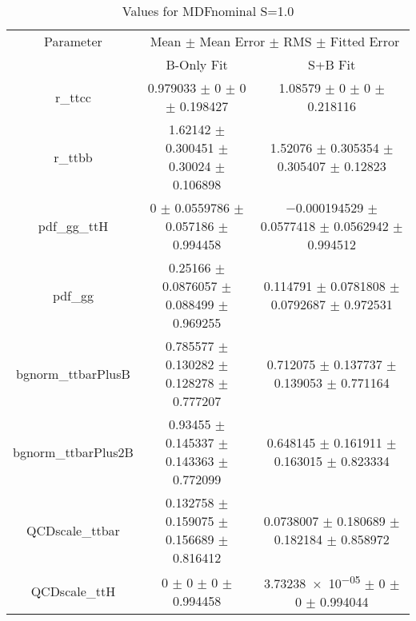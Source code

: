 \begin{table}
\centering
\caption{Values for MDFnominal S=1.0}
\begin{tabular}{ccc}
\toprule
Parameter & \multicolumn{2}{c}{Mean $\pm$ Mean Error $\pm$ RMS $\pm$ Fitted Error}\\
 & B-Only Fit & S+B Fit\\
\midrule
r\_ttcc & \num{0.979033} $\pm$ \num{0} $\pm$ \num{0} $\pm$ \num{0.198427} & \num{1.08579} $\pm$ \num{0} $\pm$ \num{0} $\pm$ \num{0.218116}\\
r\_ttbb & \num{1.62142} $\pm$ \num{0.300451} $\pm$ \num{0.30024} $\pm$ \num{0.106898} & \num{1.52076} $\pm$ \num{0.305354} $\pm$ \num{0.305407} $\pm$ \num{0.12823}\\
pdf\_gg\_ttH & \num{0} $\pm$ \num{0.0559786} $\pm$ \num{0.057186} $\pm$ \num{0.994458} & \num{-0.000194529} $\pm$ \num{0.0577418} $\pm$ \num{0.0562942} $\pm$ \num{0.994512}\\
pdf\_gg & \num{0.25166} $\pm$ \num{0.0876057} $\pm$ \num{0.088499} $\pm$ \num{0.969255} & \num{0.114791} $\pm$ \num{0.0781808} $\pm$ \num{0.0792687} $\pm$ \num{0.972531}\\
bgnorm\_ttbarPlusB & \num{0.785577} $\pm$ \num{0.130282} $\pm$ \num{0.128278} $\pm$ \num{0.777207} & \num{0.712075} $\pm$ \num{0.137737} $\pm$ \num{0.139053} $\pm$ \num{0.771164}\\
bgnorm\_ttbarPlus2B & \num{0.93455} $\pm$ \num{0.145337} $\pm$ \num{0.143363} $\pm$ \num{0.772099} & \num{0.648145} $\pm$ \num{0.161911} $\pm$ \num{0.163015} $\pm$ \num{0.823334}\\
QCDscale\_ttbar & \num{0.132758} $\pm$ \num{0.159075} $\pm$ \num{0.156689} $\pm$ \num{0.816412} & \num{0.0738007} $\pm$ \num{0.180689} $\pm$ \num{0.182184} $\pm$ \num{0.858972}\\
QCDscale\_ttH & \num{0} $\pm$ \num{0} $\pm$ \num{0} $\pm$ \num{0.994458} & \num{3.73238e-05} $\pm$ \num{0} $\pm$ \num{0} $\pm$ \num{0.994044}\\
\bottomrule
\end{tabular}
\end{table}